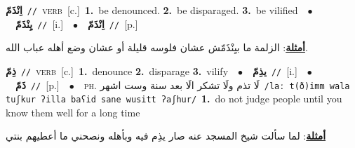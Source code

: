 \documentclass[10pt,a4paper,twoside]{article} %
\begin{document}
\begin{multicols}{2}
{{{{{{{{\setlength\topsep{0pt}\textbf{\foreignlanguage{arabic}{اِنْذَمّ}}\ {\color{gray}\texttt{//}\color{black}}\ \textsc{verb}\ [c.]\ \textbf{1.}~be denounced.  \textbf{2.}~be disparaged.  \textbf{3.}~be vilified\ \ $\bullet$\ \ \setlength\topsep{0pt}\textbf{\foreignlanguage{arabic}{يِنْذَمّ}}\ {\color{gray}\texttt{//}\color{black}}\ [i.]\ \ $\bullet$\ \ \setlength\topsep{0pt}\textbf{\foreignlanguage{arabic}{اِنْذَمّ}}\ {\color{gray}\texttt{//}\color{black}}\ [p.]\  \begin{flushright}\color{gray}\foreignlanguage{arabic}{\textbf{\underline{\foreignlanguage{arabic}{أمثلة}}}: الزلمة ما بيِنْذَمّش عشان فلوسه قليلة أو عشان وضع أهله عباب الله.}\end{flushright}\color{black}} \vspace{2mm}

{\setlength\topsep{0pt}\textbf{\foreignlanguage{arabic}{ذِمّ}}\ {\color{gray}\texttt{//}\color{black}}\ \textsc{verb}\ [c.]\ \textbf{1.}~denounce  \textbf{2.}~disparage  \textbf{3.}~vilify\ \ $\bullet$\ \ \setlength\topsep{0pt}\textbf{\foreignlanguage{arabic}{يذِمّ}}\ {\color{gray}\texttt{//}\color{black}}\ [i.]\ \ $\bullet$\ \ \setlength\topsep{0pt}\textbf{\foreignlanguage{arabic}{ذَمّ}}\ {\color{gray}\texttt{//}\color{black}}\ [p.]\ \ $\bullet$\ \ \textsc{ph.} \color{gray} \foreignlanguage{arabic}{لَا تذم ولَا تشكر الَا بعد سنة وست اشهر}\color{black}\ {\color{gray}\texttt{/{\sffamily laː t(ð)imm wala tuʃkur ʔilla baʕid sane wusitt ʔaʃhur}/}\color{black}}\ \textbf{1.}~do not judge people until you know them well for a long time\  \begin{flushright}\color{gray}\foreignlanguage{arabic}{\textbf{\underline{\foreignlanguage{arabic}{أمثلة}}}: لما سألت شيخ المسجد عنه صار يذِم فيه وبأهله ونصحني ما أعطيهم بنتي}\end{flushright}\color{black}} \vspace{2mm}

}}}}}}}
\end{multicols}
\end{document}

